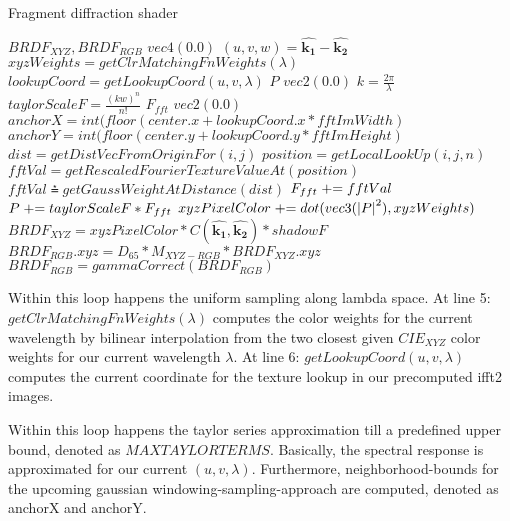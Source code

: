 \begin{algorithm}
  \caption{Fragment diffraction shader}
  \begin{algorithmic}[1]
      \State \init $BRDF_{XYZ}, BRDF_{RGB}$ \myto $vec4(0.0)$
      \State $(u,v,w) = \hat{\mathbf{k_1}}-\hat{\mathbf{k_2}}$
        \State $xyzWeights = getClrMatchingFnWeights(\lambda)$
        \State $lookupCoord = getLookupCoord(u, v, \lambda)$
        \State \init $P$ \myto $vec2(0.0)$
        \State $k = \frac{2\pi}{\lambda}$
          \State $taylorScaleF = \frac{(kw)^n}{n!}$
          \State \init $F_{fft}$  \myto $vec2(0.0)$
          \State $anchorX = int(floor(center.x + lookupCoord.x * fftImWidth)$
          \State $anchorY = int(floor(center.y + lookupCoord.y * fftImHeight)$
              \State $dist = getDistVecFromOriginFor(i,j)$
              \State $position = getLocalLookUp(i,j,n)$
              \State $fftVal = getRescaledFourierTextureValueAt(position)$
              \State $fftVal \asteq getGaussWeightAtDistance(dist)$
              \State $F_{fft} \mathrel{+}= fftVal$
            \EndFor
          \EndFor
          \State $P \mathrel{+}= taylorScaleF*F_{fft}$
        \EndFor
        \State $xyzPixelColor \mathrel{+}= dot(vec3(\left|P\right|^2), xyzWeights)$
      \EndFor
      \State $BRDF_{XYZ} = xyzPixelColor*C(\hat{\mathbf{k_1}},\hat{\mathbf{k_2}})*shadowF$
      \State $BRDF_{RGB}.xyz = D_{65}*M_{XYZ-RGB}*BRDF_{XYZ}.xyz$
      \State $BRDF_{RGB}= gammaCorrect(BRDF_{RGB})$
    \EndFor
  \end{algorithmic}
\end{algorithm}


Within this loop happens the uniform sampling along lambda space. At line 5: $getClrMatchingFnWeights(\lambda)$ computes the color weights for the current wavelength by bilinear interpolation from the two closest given $CIE_{XYZ}$ color weights for our current wavelength $\lambda$. At line 6: $getLookupCoord(u, v, \lambda)$ computes the current coordinate for the texture lookup in our precomputed ifft2 images. 

Within this loop happens the taylor series approximation till a predefined upper bound, denoted as $MAXTAYLORTERMS$.
Basically, the spectral response is approximated for our current $(u,v,\lambda)$. Furthermore, neighborhood-bounds for the upcoming gaussian windowing-sampling-approach are computed, denoted as anchorX and anchorY.

